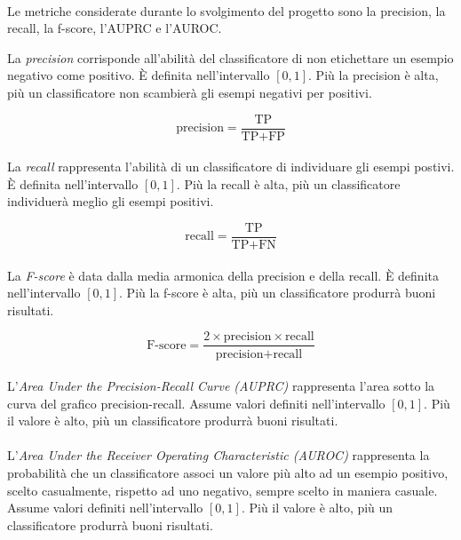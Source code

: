 \documentclass[12pt,a4paper,oneside,hidelinks]{report}
\begin{document}
\paragraph*{}
Le metriche considerate durante lo svolgimento del progetto sono la precision, la recall, la f-score, l'AUPRC e l'AUROC.

La \textit{precision} corrisponde all'abilità del classificatore di non etichettare un esempio negativo come positivo. È definita nell'intervallo $[0,1]$. Più la precision è alta, più un classificatore non scambierà gli esempi negativi per positivi.

\begin{equation}
\text{precision} = \frac{\text{TP}}{\text{TP} + \text{FP}}
\end{equation}

\paragraph*{}
La \textit{recall} rappresenta l'abilità di un classificatore di individuare gli esempi postivi. È definita nell'intervallo $[0,1]$. Più la recall è alta, più un classificatore individuerà meglio gli esempi positivi.

\begin{equation}
\text{recall} = \frac{\text{TP}}{\text{TP} + \text{FN}}
\end{equation}

\paragraph*{}
La \textit{F-score} è data dalla media armonica della precision e della recall. È definita nell'intervallo $[0,1]$. Più la f-score è alta, più un classificatore produrrà buoni risultati.

\begin{equation}
\text{F-score} = \frac{2 \times \text{precision} \times \text{recall}}{\text{precision} + \text{recall}}
\end{equation}

\paragraph*{}
L'\textit{Area Under the Precision-Recall Curve (AUPRC)} rappresenta l'area sotto la curva del grafico precision-recall. Assume valori definiti nell'intervallo $[0,1]$. Più il valore è alto, più un classificatore produrrà buoni risultati.

\paragraph*{}
L'\textit{Area Under the Receiver Operating Characteristic (AUROC)} rappresenta la probabilità che un classificatore associ un valore più alto ad un esempio positivo, scelto casualmente, rispetto ad uno negativo, sempre scelto in maniera casuale. Assume valori definiti nell'intervallo $[0,1]$. Più il valore è alto, più un classificatore produrrà buoni risultati.
\end{document}
